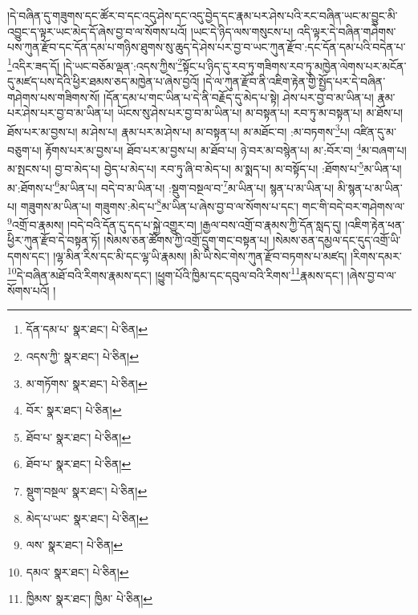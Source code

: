 །དེ་བཞིན་དུ་གཟུགས་དང་ཚོར་བ་དང་འདུ་ཤེས་དང་འདུ་བྱེད་དང་རྣམ་པར་ཤེས་པའི་རང་བཞིན་ཡང་མ་བྱུང་མི་འབྱུང་ད་ལྟར་ཡང་མེད་དོ་ཞེས་བྱ་བ་ལ་སོགས་པའོ། །ཡང་དེ་ཉིད་ལས་གསུངས་པ། འདི་ལྟར་དེ་བཞིན་གཤེགས་པས་ཀུན་རྫོབ་དང་དོན་དམ་པ་གཉིས་ཐུགས་སུ་ཆུད་དེ་ཤེས་པར་བྱ་བ་ཡང་ཀུན་རྫོབ་:དང་དོན་དམ་པའི་བདེན་པ་\footnote{དོན་དམ་པ་  སྣར་ཐང་།  པེ་ཅིན། }འདིར་ཟད་དོ། །དེ་ཡང་བཅོམ་ལྡན་:འདས་ཀྱིས་\footnote{འདས་ཀྱི་  སྣར་ཐང་།  པེ་ཅིན། }སྟོང་པ་ཉིད་དུ་རབ་ཏུ་གཟིགས་རབ་ཏུ་མཁྱེན་ལེགས་པར་མངོན་དུ་མཛད་པས་དེའི་ཕྱིར་ཐམས་ཅད་མཁྱེན་པ་ཞེས་བྱའོ། །དེ་ལ་ཀུན་རྫོབ་ནི་འཇིག་རྟེན་གྱི་སྤྱོད་པར་དེ་བཞིན་གཤེགས་པས་གཟིགས་སོ། །དོན་དམ་པ་གང་ཡིན་པ་དེ་ནི་བརྗོད་དུ་མེད་པ་སྟེ། ཤེས་པར་བྱ་བ་མ་ཡིན་པ། རྣམ་པར་ཤེས་པར་བྱ་བ་མ་ཡིན་པ། ཡོངས་སུ་ཤེས་པར་བྱ་བ་མ་ཡིན་པ། མ་བསྟན་པ། རབ་ཏུ་མ་བསྟན་པ། མ་ཐོས་པ། ཐོས་པར་མ་བྱས་པ། མ་ཤེས་པ། རྣམ་པར་མ་ཤེས་པ། མ་བསྟན་པ། མ་མཐོང་བ། :མ་བཏགས་\footnote{མ་གཏོགས་  སྣར་ཐང་།  པེ་ཅིན། }པ། འཛིན་དུ་མ་བཅུག་པ། རྟོགས་པར་མ་བྱས་པ། ཐོབ་པར་མ་བྱས་པ། མ་ཐོབ་པ། ཉེ་བར་མ་བསྙེན་པ། མ་:བོར་བ། \footnote{བོར་  སྣར་ཐང་།  པེ་ཅིན། }མ་བཞག་པ། མ་སྤངས་པ། བྱ་བ་མེད་པ། བྱེད་པ་མེད་པ། རབ་ཏུ་ཞི་བ་མེད་པ། མ་སྨད་པ། མ་བསྟོད་པ། :ཐོགས་པ་\footnote{ཐོབ་པ་  སྣར་ཐང་།  པེ་ཅིན། }མ་ཡིན་པ། མ་:ཐོགས་པ་\footnote{ཐོབ་པ་  སྣར་ཐང་།  པེ་ཅིན། }མ་ཡིན་པ། བདེ་བ་མ་ཡིན་པ། :སྡུག་བསྔལ་བ་\footnote{སྡུག་བསྔལ་  སྣར་ཐང་།  པེ་ཅིན། }མ་ཡིན་པ། སྙན་པ་མ་ཡིན་པ། མི་སྙན་པ་མ་ཡིན་པ། གཟུགས་མ་ཡིན་པ། གཟུགས་:མེད་པ་\footnote{མེད་པ་ཡང་  སྣར་ཐང་།  པེ་ཅིན། }མ་ཡིན་པ་ཞེས་བྱ་བ་ལ་སོགས་པ་དང་། གང་གི་བདེ་བར་གཤེགས་ལ་\footnote{ལས་  སྣར་ཐང་།  པེ་ཅིན། }འགྲོ་བ་རྣམས། །བདེ་བའི་དོན་དུ་དད་པ་སྐྱེ་འགྱུར་བ། །རྒྱལ་བས་འགྲོ་བ་རྣམས་ཀྱི་དོན་སླད་དུ། །འཇིག་རྟེན་ཕན་ཕྱིར་ཀུན་རྫོབ་དེ་བསྟན་ཏོ། །སེམས་ཅན་ཚོགས་ཀྱི་འགྲོ་དྲུག་གང་བསྟན་པ། །སེམས་ཅན་དམྱལ་དང་དུད་འགྲོ་ཡི་དགས་དང་། །ལྷ་མིན་རིས་དང་མི་དང་ལྷ་ཡི་རྣམས། །མི་ཡི་སེང་གེས་ཀུན་རྫོབ་བཏགས་པ་མཛད། །རིགས་དམར་\footnote{དམའ་  སྣར་ཐང་།  པེ་ཅིན། }དེ་བཞིན་མཐོ་བའི་རིགས་རྣམས་དང་། །ཕྱུག་པོའི་ཁྱིམ་དང་དབུལ་བའི་རིགས་\footnote{ཁྱིམས་  སྣར་ཐང་། ཁྱིམ་  པེ་ཅིན། }རྣམས་དང་། །ཞེས་བྱ་བ་ལ་སོགས་པའོ། །
